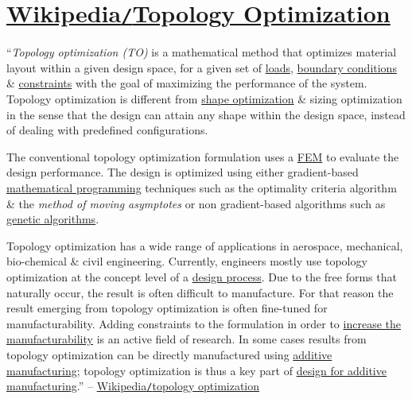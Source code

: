 \documentclass[oneside]{book}
\numberwithin{equation}{section}
\begin{document}

\section{\href{https://en.wikipedia.org/wiki/Topology_optimization}{Wikipedia\texttt{/}Topology Optimization}}
``\textit{Topology optimization (TO)} is a mathematical method that optimizes material layout within a given design space, for a given set of \href{https://en.wikipedia.org/wiki/Structural_load}{loads}, \href{https://en.wikipedia.org/wiki/Boundary_conditions}{boundary conditions} \& \href{https://en.wikipedia.org/wiki/Constraint_(mathematics)}{constraints} with the goal of maximizing the performance of the system. Topology optimization is different from \href{https://en.wikipedia.org/wiki/Shape_optimization}{shape optimization} \& sizing optimization in the sense that the design can attain any shape within the design space, instead of dealing with predefined configurations.

The conventional topology optimization formulation uses a \href{https://en.wikipedia.org/wiki/Finite_element_method}{FEM} to evaluate the design performance. The design is optimized using either gradient-based \href{https://en.wikipedia.org/wiki/Mathematical_programming}{mathematical programming} techniques such as the optimality criteria algorithm \& the \textit{method of moving asymptotes} or non gradient-based algorithms such as \href{https://en.wikipedia.org/wiki/Genetic_algorithms}{genetic algorithms}.

Topology optimization has a wide range of applications in aerospace, mechanical, bio-chemical \& civil engineering. Currently, engineers mostly use topology optimization at the concept level of a \href{https://en.wikipedia.org/wiki/Engineering_design_process}{design process}. Due to the free forms that naturally occur, the result is often difficult to manufacture. For that reason the result emerging from topology optimization is often fine-tuned for manufacturability. Adding constraints to the formulation in order to \href{https://en.wikipedia.org/wiki/Design_for_manufacturability}{increase the manufacturability} is an active field of research. In some cases results from topology optimization can be directly manufactured using \href{https://en.wikipedia.org/wiki/Additive_manufacturing}{additive manufacturing}; topology optimization is thus a key part of \href{https://en.wikipedia.org/wiki/Design_for_additive_manufacturing}{design for additive manufacturing}.'' -- \href{https://en.wikipedia.org/wiki/Topology_optimization}{Wikipedia\texttt{/}topology optimization}
\end{document}

